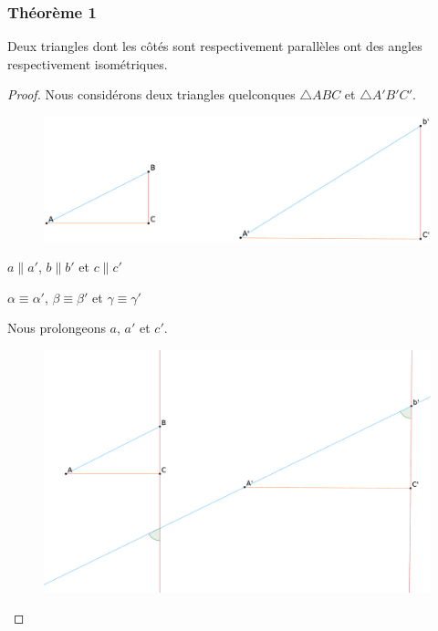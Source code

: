 \documentclass[a4paper,12pt]{article}
\begin{document}
\subsubsection{Théorème 1}
\begin{theorem}
Deux triangles dont les côtés sont respectivement parallèles ont des angles respectivement isométriques.
\end{theorem}

\begin{proof}
Nous considérons deux triangles quelconques $\triangle ABC$ et $\triangle A'B'C'$.



\begin{figure}[H]
        \centering
        \includegraphics[scale=0.2]{semblable1.1.eps}
    \end{figure}

\begin{hyp}
$a \parallel a'$, $b \parallel b'$ et $c \parallel c'$
\end{hyp}
\begin{concl}
$\alpha \equiv \alpha'$, $\beta \equiv \beta'$ et $\gamma \equiv \gamma'$
\end{concl}

Nous prolongeons $a$, $a'$ et $c'$. 

\begin{figure}[H]
        \centering
        \includegraphics[scale=0.2]{semblable1.2.eps}
    \end{figure}


\end{proof}
\end{document}
